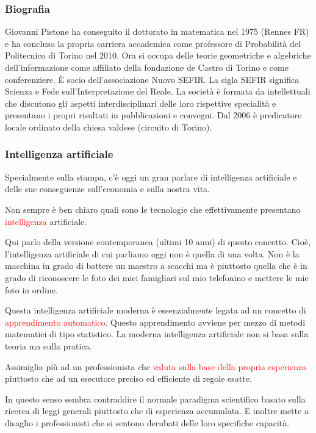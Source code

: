 \documentclass[xcolor=svgnames]{beamer}
\newcommand{\rosso}[1]{\textcolor{red}{#1}}
\renewcommand{\emph}{\rosso}
\begin{document}
\begin{frame}[plain]\tiny\frametitle{Biografia}
  Giovanni Pistone ha conseguito il dottorato in matematica nel 1975 (Rennes FR) e ha concluso la propria carriera accademica come professore di Probabilità del Politecnico di Torino nel 2010. Ora si occupa delle teorie geometriche e algebriche dell’informazione come affiliato della fondazione de Castro di Torino e come conferenziere. \`E socio dell’associazione Nuovo SEFIR. La sigla SEFIR significa Scienza e Fede sull’Interpretazione del Reale. La società è formata da intellettuali che discutono gli aspetti interdisciplinari delle loro rispettive specialità e presentano i propri risultati in pubblicazioni e convegni. Dal 2006 è predicatore locale ordinato della chiesa valdese (circuito di Torino).  
\end{frame}

\begin{frame}[plain]\small\frametitle{Intelligenza artificiale}

Specialmente sulla stampa, c'è oggi un gran parlare di intelligenza artificiale e delle sue conseguenze sull'economia e sulla nostra vita. 

Non sempre è ben chiaro quali sono le tecnologie che effettivamente presentano \emph{intelligenza} artificiale. 

Qui parlo della versione contemporanea (ultimi 10 anni) di questo concetto. Cioè, l'intelligenza artificiale di cui parliamo oggi non è quella di una volta. Non è la macchina in grado di battere un maestro a scacchi ma è piuttosto quella che è in grado di riconoscere le foto dei miei famigliari sul mio telefonino e mettere le mie foto in ordine.

Questa intelligenza artificiale moderna è essenzialmente legata ad un concetto di \emph{apprendimento automatico}. Questo apprendimento avviene per mezzo di metodi matematici di tipo statistico. La moderna intelligenza artificiale non si basa sulla teoria ma sulla pratica. 

Assimiglia più ad un professionista che \emph{valuta sulla base della propria esperienza} piuttosto che ad un esecutore preciso ed efficiente di regole esatte.

In questo senso sembra contraddire il normale paradigma scientifico basato sulla ricerca di leggi generali piuttosto che di esperienza accumulata. E inoltre mette a disaglio i professionisti che si sentono derubati delle loro specifiche capacità.

\end{frame}
\end{document}
